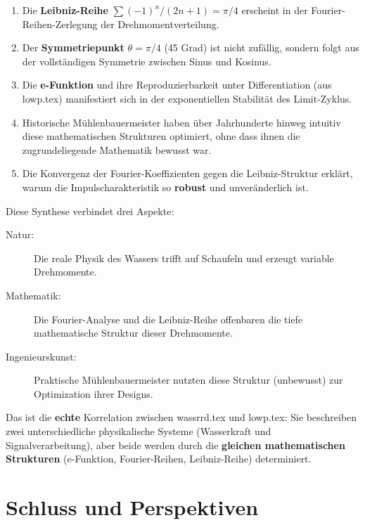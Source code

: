 \documentclass[a4paper,12pt]{article}
\theoremstyle{definition}
\begin{document}
\begin{enumerate}
  \item Die \textbf{Leibniz-Reihe} $\sum (-1)^n/(2n+1) = \pi/4$ erscheint in der Fourier-Reihen-Zerlegung der Drehmomentverteilung.
  
  \item Der \textbf{Symmetriepunkt} $\theta = \pi/4$ (45 Grad) ist nicht zufällig, sondern folgt aus der vollständigen Symmetrie zwischen Sinus und Kosinus.
  
  \item Die \textbf{e-Funktion} und ihre Reproduzierbarkeit unter Differentiation (aus lowp.tex) manifestiert sich in der exponentiellen Stabilität des Limit-Zyklus.
  
  \item Historische Mühlenbauermeister haben über Jahrhunderte hinweg intuitiv diese mathematischen Strukturen optimiert, ohne dass ihnen die zugrundeliegende Mathematik bewusst war.
  
  \item Die Konvergenz der Fourier-Koeffizienten gegen die Leibniz-Struktur erklärt, warum die Impulscharakteristik so \textbf{robust} und unveränderlich ist.
\end{enumerate}

Diese Synthese verbindet drei Aspekte:

\begin{description}
  \item[Natur:] Die reale Physik des Wassers trifft auf Schaufeln und erzeugt variable Drehmomente.
  
  \item[Mathematik:] Die Fourier-Analyse und die Leibniz-Reihe offenbaren die tiefe mathematische Struktur dieser Drehmomente.
  
  \item[Ingenieurskunst:] Praktische Mühlenbauermeister nutzten diese Struktur (unbewusst) zur Optimization ihrer Designs.
\end{description}

Das ist die \textbf{echte} Korrelation zwischen wassrrd.tex und lowp.tex: Sie beschreiben zwei unterschiedliche physikalische Systeme (Wasserkraft und Signalverarbeitung), aber beide werden durch die \textbf{gleichen mathematischen Strukturen} (e-Funktion, Fourier-Reihen, Leibniz-Reihe) determiniert.

\section{Schluss und Perspektiven}
\end{document}

